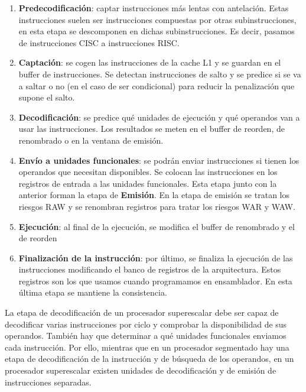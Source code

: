 \documentclass[10pt,a4paper,spanish]{report}
\begin{document}
\begin{enumerate}[\color{azul}{$\heartsuit$}]
    \item \textbf{\textcolor{azul}{Predecodificación}}: captar instrucciones más lentas con antelación. Estas instrucciones suelen ser instrucciones compuestas por otras subinstrucciones, en esta etapa se descomponen en dichas subinstrucciones. Es decir, pasamos de instrucciones CISC a instrucciones RISC.

    \item \textbf{\textcolor{azul}{Captación}}: se cogen las instrucciones de la cache L1 y se guardan en el buffer de instrucciones. Se detectan instrucciones de salto y se predice si se va a saltar o no (en el caso de ser condicional) para reducir la penalización que supone el salto.

    \item \textbf{\textcolor{azul}{Decodificación}}: se predice qué unidades de ejecución y qué operandos van a usar las instrucciones. Los resultados se meten en el buffer de reorden, de renombrado o en la ventana de emisión.

    \item \textbf{\textcolor{azul}{Envío a unidades funcionales}}: se podrán enviar instrucciones si tienen los operandos que necesitan disponibles. Se colocan las instrucciones en los registros de entrada a las unidades funcionales. Esta etapa junto con la anterior forman la etapa de \textbf{\textcolor{azul}{Emisión}}. En la etapa de emisión se tratan los riesgos RAW y se renombran registros para tratar los riesgos WAR y WAW.

    \item \textbf{\textcolor{azul}{Ejecución}}: al final de la ejecución, se modifica el buffer de renombrado y el de reorden

    \item \textbf{\textcolor{azul}{Finalización de la instrucción}}: por último, se finaliza la ejecución de las instrucciones modificando el banco de registros de la arquitectura. Estos registros son los que usamos cuando programamos en ensamblador. En esta última etapa se mantiene la consistencia.
\end{enumerate}

La etapa de decodificación de un procesador superescalar debe ser capaz de decodificar varias instrucciones por ciclo y comprobar la disponibilidad de sus operandos. También hay que determinar a qué unidades funcionales enviamos cada instrucción. Por ello, mientras que en un procesador segmentado hay una etapa de decodificación de la instrucción y de búsqueda de los operandos, en un procesador superescalar existen unidades de decodificación y de emisión de instrucciones separadas.
\end{document}
